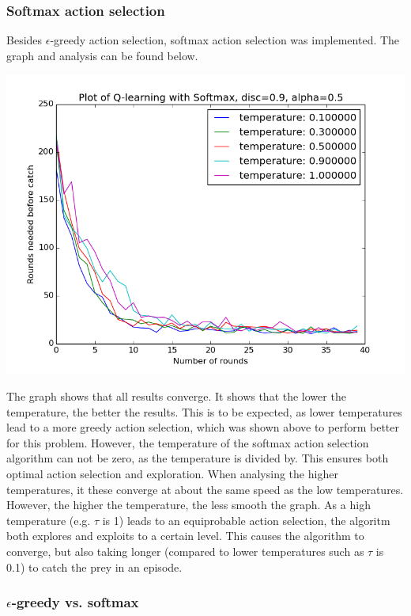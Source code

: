 \documentclass{article}
\begin{document}
\subsubsection{Softmax action selection}
Besides $\epsilon$-greedy action selection, softmax action selection was implemented. The graph and analysis can be found below. 
\begin{center}
	\includegraphics[scale=0.4]{softmax_with_legend}
\end{center}

The graph shows that all results converge. It shows that the lower the temperature, the better the results. This is to be expected, as lower temperatures lead to a more greedy action selection, which was shown above to perform better for this problem. However, the temperature of the softmax action selection algorithm can not be zero, as the temperature is divided by. This ensures both optimal action selection and exploration. When analysing the higher temperatures, it these converge at about the same speed as the low temperatures. However, the higher the temperature, the less smooth the graph. As a high temperature (e.g. $\tau$ is 1) leads to an equiprobable action selection, the algoritm both explores and exploits to a certain level. This causes the algorithm to converge, but also taking longer (compared to lower temperatures such as $\tau$ is 0.1) to catch the prey in an episode.


\subsubsection{$\epsilon$-greedy vs. softmax}
\end{document}
